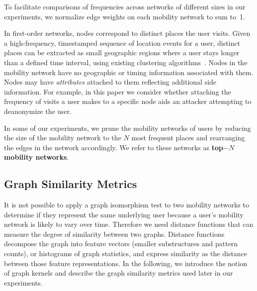 
\vspace{.4cm}
To facilitate comparisons of frequencies across networks of different sizes in our experiments, we normalize edge weights on each mobility network to sum \mbox{to 1}.

In first-order networks, nodes correspond to distinct places the user visits.
Given a high-frequency, timestamped sequence of location events for a user, distinct places can be extracted as small geographic regions where a user stays longer than a defined time interval, using existing clustering algorithms~\cite{kang2005extracting}.
Nodes in the mobility network have no geographic or timing information associated with them.
Nodes may have \emph{attributes} attached to them reflecting additional side information.
For example, in this paper we consider whether attaching the frequency of visits a user makes to a specific node aids an attacker attempting to deanonymize the user.

In some of our experiments, we prune the mobility networks of users by reducing the size of the mobility network to the $ N $ most frequent places and rearranging the edges in the network accordingly.
We refer to these networks as \textbf{top$-N $ mobility networks}.

\subsection{Graph Similarity Metrics\label{sec:graph-kernels}}

It is not possible to apply a graph isomorphism test to two mobility networks to determine if they represent the same underlying user because a user's mobility network is likely to vary over time.
Therefore we need distance functions that can measure the degree of similarity between two graphs.
Distance functions decompose the graph into feature vectors (smaller substructures and pattern counts), or histograms of graph statistics, and express similarity as the distance between those feature representations.
In the following, we introduce the notion of graph kernels and describe the graph similarity metrics used later in our experiments.

